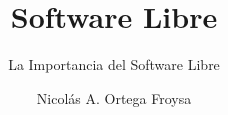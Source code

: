\documentclass[xetex, mathserif, serif]{beamer}
\title{Software Libre}
\subtitle{La Importancia del Software Libre}
\author{Nicolás A. Ortega Froysa}
\date{} %
\begin{document}
\frame{\titlepage}
\end{document}
